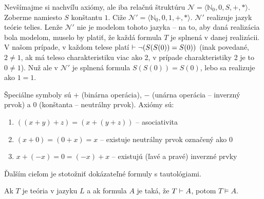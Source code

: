 \begin{poznamka}
    Nevšímajme si nachvíľu axiómy, ale iba relačnú štruktúru
    $\mathcal{N}=\langle \mathbb{N}_0,0,S,+,* \rangle$.
    Zoberme namiesto $S$ konštantu $1$.
    Ciže $\mathcal{N}'=\langle \mathbb{N}_0,0,1,+,* \rangle$.
    $\mathcal{N}'$ realizuje jazyk teórie telies.
    Lenže $\mathcal{N}'$ nie je modelom tohoto jazyka --
    na to, aby daná realizácia bola modelom, muselo by platiť, že
    každá formula $T$ je splnená v danej realizácii. V našom prípade,
    v každom telese platí $\vdash \neg (S(S(0))=S(0))$ (inak
    povedané, $2 \ne 1$, ak má teleso charakteristiku viac ako 2,
    v prípade charakteristiky 2 je to $0 \ne 1$). Nuž ale v 
    $\mathcal{N}'$ je splnená formula $S(S(0))=S(0)$, lebo sa
    realizuje ako $1=1$.
\end{poznamka}

\begin{priklad}
    Špeciálne symboly sú $+$ (binárna operácia), $-$ (unárna operácia
    -- inverzný prvok) a $0$ (konštanta -- neutrálny prvok).
    Axiómy sú:
    \begin{enumerate}
            \item $((x+y)+z) = (x+(y+z))$ -- asociativita
            \item $(x+0) = (0+x) = x$ -- existuje neutrálny prvok
            označený ako 0
            \item $x+(-x) = 0 = (-x)+x$ -- existujú (ľavé a pravé) inverzné
            prvky
    \end{enumerate}
\end{priklad}

Ďalším cieľom je stotožniť dokázateľné formuly s tautológiami.

\begin{veta}[O korektnosti]
    Ak $T$ je teória v jazyku $L$ a ak formula $A$ je taká,
    že $T \vdash A$, potom $T \models A$.
\end{veta}

